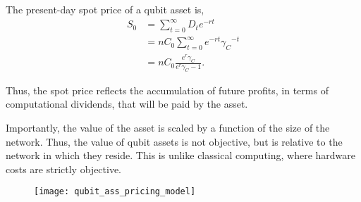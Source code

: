 \begin{definition} \label{def:qubit_ass_pricing}
The present-day spot price of a qubit asset is,	
\begin{align}
S_0 &= \sum_{t=0}^\infty D_t e^{-rt} \nonumber \\
&= n C_0 \sum_{t=0}^\infty e^{-rt} {\gamma_C}^{-t} \nonumber \\
&= n C_0 \frac{e^r \gamma_C}{e^r \gamma_C - 1}.
\end{align}	
\end{definition}

Thus, the spot price reflects the accumulation of future profits, in terms of computational dividends, that will be paid by the asset.

Importantly, the value of the asset is scaled by a function of the size of the network. Thus, the value of qubit assets is not objective, but is relative to the network in which they reside. This is unlike classical computing, where hardware costs are strictly objective.

\begin{figure}[!htb]
\texttt{[image: qubit\_ass\_pricing\_model]}
\caption{}\label{fig:qubit_ass_pricing_model}
\end{figure}





